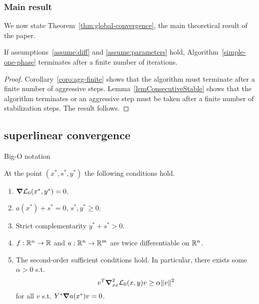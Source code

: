 \documentclass{article}
\begin{document}
\subsubsection{Main result}\label{subsec:main-result}

We now state Theorem~\ref{thm:global-convergence}, the main theoretical result of the paper.

\begin{theorem}\label{thm:global-convergence}
If assumptions~\ref{assume:diff} and \ref{assume:parameters} hold, Algorithm~\ref{simple-one-phase} terminates after a finite number of iterations.
\end{theorem}

\begin{proof}
Corollary~\ref{coro:agg-finite} shows that the algorithm must terminate after a finite number of aggressive steps. Lemma~\ref{lemConsecutiveStable} shows that the algorithm terminates or an aggressive step must be taken after a finite number of stabilization steps. The result follows.
\end{proof}



\if{}

\subsection{superlinear convergence}


\begin{definition}
Big-O notation
\end{definition}

\begin{assumption}\label{second-order-sufficient-conditions}
At the point $(x^{*},s^{*},y^{*})$ the following conditions hold.
\begin{enumerate}
\item $\grad \mathcal{L}_{0}(x^{*}, y^{*}) = 0$.
\item $a(x^{*}) + s^{*} = 0$, $s^{*}, y^{*} \ge 0$.
\item Strict complementarity $y^{*} + s^{*} > 0$.
\item $f : \mathbb{R}^{n} \rightarrow \mathbb{R}$ and $a : \mathbb{R}^{n} \rightarrow \mathbb{R}^{m}$ are twice differentiable on $\mathbb{R}^{n}$.
\item The second-order sufficient conditions hold. In particular, there exists some $\alpha > 0$ s.t.
$$
v^T \grad^2_{xx} \mathcal{L}_{0}(x,y) v \ge \alpha \| v \|^2
$$
for all $v$ s.t. $Y^{*} \grad a(x^{*}) v = 0$.
\end{enumerate}
\end{assumption}
\end{document}
